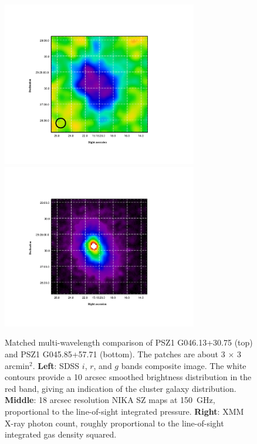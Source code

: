 \documentclass[11pt,a4paper,twoside,graphicx,color]{article}
\begin{document}
\begin{figure}[h!]
	\includegraphics[trim=4.0cm 0cm 6cm 0cm, clip=true,height=7.2cm]{PSZ1G045_NIKA.pdf}
	\includegraphics[trim=4.0cm 0cm 6cm 0cm, clip=true,height=7.2cm]{PSZ1G045_XMM.pdf}
	\caption{Matched multi-wavelength comparison of PSZ1 G046.13+30.75 (top) and PSZ1 G045.85+57.71 (bottom). The patches are about 3 $\times$ 3 arcmin$^2$. {\bf Left}: SDSS $i$, $r$, and $g$ bands composite image. The white contours provide a 10 arcsec smoothed brightness distribution in the red band, giving an indication of the cluster galaxy distribution. {\bf Middle}: 18 arcsec resolution NIKA SZ maps at 150~GHz, proportional to the line-of-sight integrated pressure. {\bf Right}: XMM X-ray photon count, roughly proportional to the line-of-sight integrated gas density squared.}
	\label{fig:PSZ1G046} 
\end{figure}
\end{document}
